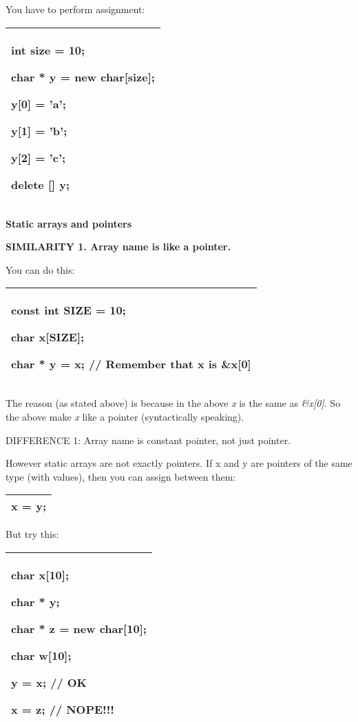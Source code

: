 \documentclass[
]{article}
\begin{document}
You have to perform assignment:

\begin{longtable}[]{@{}l@{}}
\toprule
\endhead
\begin{minipage}[t]{0.97\columnwidth}\raggedright
int size = 10;

char * y = new char{[}size{]};

y{[}0{]} = 'a';

y{[}1{]} = 'b';

y{[}2{]} = 'c';

delete {[}{]} y;\strut
\end{minipage}\tabularnewline
\bottomrule
\end{longtable}

\textbf{Static arrays and pointers}

\textbf{SIMILARITY 1. Array name is like a pointer.}

You can do this:

\begin{longtable}[]{@{}l@{}}
\toprule
\endhead
\begin{minipage}[t]{0.97\columnwidth}\raggedright
const int SIZE = 10;

char x{[}SIZE{]};

char * y = x; // Remember that x is \&x{[}0{]}\strut
\end{minipage}\tabularnewline
\bottomrule
\end{longtable}

The reason (as stated above) is because in the above \emph{x} is the
same as \emph{\&x{[}0{]}}. So the above make \emph{x} like a pointer
(syntactically speaking).

DIFFERENCE 1: Array name is constant pointer, not just pointer.

However static arrays are not exactly pointers. If x and y are pointers
of the same type (with values), then you can assign between them:

\begin{longtable}[]{@{}l@{}}
\toprule
\endhead
x = y;\tabularnewline
\bottomrule
\end{longtable}

But try this:

\begin{longtable}[]{@{}l@{}}
\toprule
\endhead
\begin{minipage}[t]{0.97\columnwidth}\raggedright
char x{[}10{]};

char * y;

char * z = new char{[}10{]};

char w{[}10{]};

y = x; // OK

x = z; // NOPE!!!\strut
\end{minipage}\tabularnewline
\bottomrule
\end{longtable}
\end{document}
